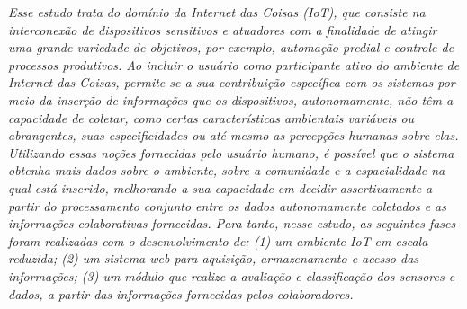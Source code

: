 \emph{
Esse estudo trata do domínio da Internet das Coisas (IoT), que consiste na interconexão de dispositivos
 sensitivos e atuadores com a finalidade de atingir uma grande variedade de objetivos, por exemplo, automação predial e controle de processos produtivos.
 Ao incluir o usuário como participante ativo do ambiente de Internet das Coisas,
 permite-se a sua contribuição específica com os sistemas por meio da inserção de informações que os
  dispositivos, autonomamente, não têm a capacidade de coletar,
 como certas características ambientais variáveis ou abrangentes, suas especificidades ou até
  mesmo as percepções humanas sobre elas.
  Utilizando essas noções fornecidas pelo usuário humano, é possível que o sistema obtenha mais
  dados sobre o ambiente, sobre a comunidade e a espacialidade na qual está inserido, melhorando
  a sua capacidade em decidir assertivamente a partir do processamento conjunto entre os dados autonomamente
  coletados e as informações colaborativas fornecidas.
  Para tanto, nesse estudo, as seguintes fases foram realizadas com o desenvolvimento de: (1) um ambiente IoT em escala reduzida;
  (2) um sistema web para aquisição, armazenamento e acesso das informações;
  (3) um módulo que realize a avaliação e classificação dos sensores e dados,
  a partir das informações fornecidas pelos colaboradores.
}
